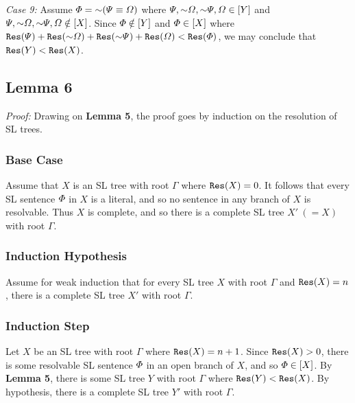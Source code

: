 \textit{Case 9:}
Assume $\metaA=\enot(\metaB\eiff\metaC)$ where $\metaB,\enot\metaC,\enot\metaB,\metaC\in[Y]$ and $\metaB,\enot\metaC,\enot\metaB,\metaC\notin[X]$.
Since $\varPhi\notin[Y]$ and $\varPhi\in[X]$ where $\res(\metaB)+\res(\enot\metaC)+\res(\enot\metaB)+\res(\metaC)<\res(\metaA)$, we may conclude that $\texttt{Res}(Y)<\texttt{Res}(X)$.




\subsection{Lemma 6}

\label{CompleteTreeLemma}

\textit{Proof:}
Drawing on \textbf{Lemma 5}, the proof goes by induction on the resolution of SL trees.

\subsubsection{Base Case}

Assume that $X$ is an SL tree with root $\Gamma$ where $\texttt{Res}(X)=0$.
It follows that every SL sentence $\varPhi$ in $X$ is a literal, and so no sentence in any branch of $X$ is resolvable. 
Thus $X$ is complete, and so there is a complete SL tree $X'\ (=X)$ with root $\Gamma$.


\subsubsection{Induction Hypothesis}

Assume for weak induction that for every SL tree $X$ with root $\Gamma$ and $\texttt{Res}(X)=n$, there is a complete SL tree $X'$ with root $\Gamma$.



\subsubsection{Induction Step}

Let $X$ be an SL tree with root $\Gamma$ where $\texttt{Res}(X)=n+1$.
Since $\texttt{Res}(X)>0$, there is some resolvable SL sentence $\varPhi$ in an open branch of $X$, and so $\varPhi \in [X]$. 
By \textbf{Lemma 5}, there is some SL tree $Y$ with root $\Gamma$ where $\texttt{Res}(Y)<\texttt{Res}(X)$.
By hypothesis, there is a complete SL tree $Y'$ with root $\Gamma$.




